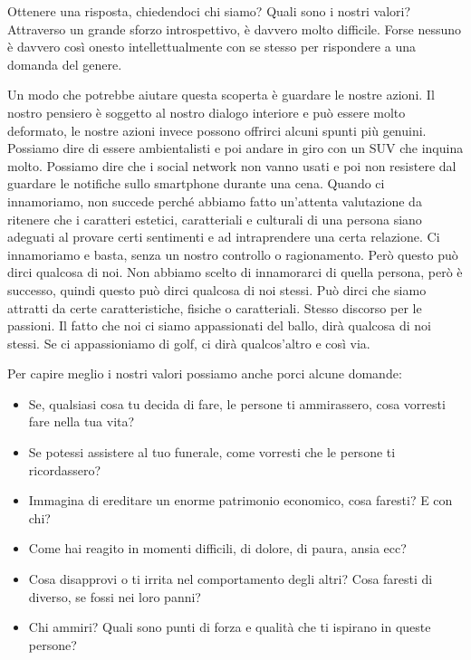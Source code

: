 \documentclass[12pt]{book} %
\begin{document}
Ottenere una risposta, chiedendoci chi siamo? Quali sono i nostri valori? Attraverso un grande sforzo introspettivo, è
davvero molto difficile. Forse nessuno è davvero così onesto intellettualmente con se stesso per rispondere a una
domanda del genere. 

Un modo che potrebbe aiutare questa scoperta è guardare le nostre azioni. Il nostro pensiero è soggetto al nostro
dialogo interiore e può essere molto deformato, le nostre azioni invece possono offrirci alcuni spunti più genuini.
Possiamo dire di essere ambientalisti e poi andare in giro con un SUV che inquina molto. Possiamo
dire che i social network non vanno usati e poi non resistere dal guardare le notifiche sullo smartphone durante una
cena. Quando ci innamoriamo, non succede perché abbiamo fatto
un'attenta valutazione da ritenere che i caratteri estetici, caratteriali e culturali di una persona siano
adeguati al provare certi sentimenti e ad intraprendere una certa relazione. Ci innamoriamo e basta, senza un nostro
controllo o ragionamento. Però questo può dirci qualcosa di noi. Non abbiamo scelto di innamorarci di quella persona,
però è successo, quindi questo può dirci qualcosa di noi stessi. Può dirci che siamo attratti da certe caratteristiche, fisiche o caratteriali.
Stesso discorso per le passioni. Il fatto che noi ci siamo appassionati del ballo, dirà qualcosa di noi stessi. Se ci appassioniamo di golf, ci dirà qualcos'altro e così via. 

Per capire meglio i nostri valori possiamo anche porci alcune domande:

\begin{itemize}
\item Se, qualsiasi cosa tu decida di fare, le persone ti ammirassero, cosa vorresti fare nella tua vita?
\item Se potessi assistere al tuo funerale, come vorresti che le persone ti ricordassero?
\item Immagina di ereditare un enorme patrimonio economico, cosa faresti? E con chi?
\item Come hai reagito in momenti difficili, di dolore, di paura, ansia ecc?
\item Cosa disapprovi o ti irrita nel comportamento degli altri? Cosa faresti di diverso, se fossi nei loro panni?
\item Chi ammiri? Quali sono punti di forza e qualità che ti ispirano in queste persone?
\end{itemize}

\bigskip
\end{document}
